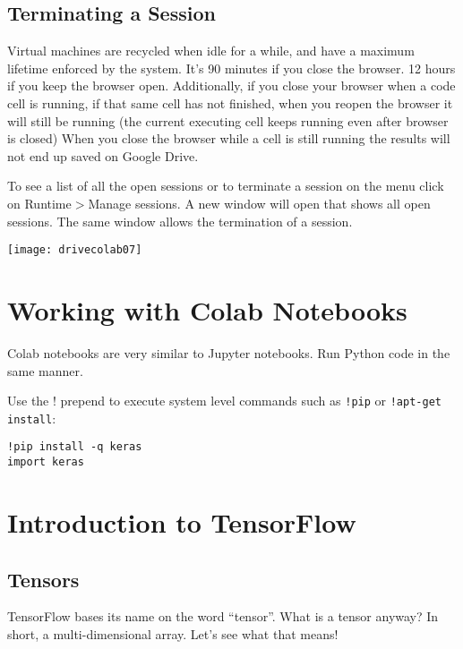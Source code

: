 \subsection{Terminating a Session}

Virtual machines are recycled when idle for a while, and have a maximum lifetime enforced by the system.
It's 90 minutes if you close the browser. 12 hours if you keep the browser open. Additionally, if you close your browser when a code cell is running, if that same cell has not finished, when you reopen the browser it will still be running (the current executing cell keeps running even after browser is closed)
When you close the browser while a cell is still running the results will not end up saved on Google Drive.


To see a list of all the open sessions or to terminate a session on the menu click on Runtime$>$Manage sessions.  A new window will open that shows all open sessions.  The same window allows the termination of a session.
\begin{marginfigure}
\texttt{[image: drivecolab07]}
\end{marginfigure}




\section{Working with Colab Notebooks}

Colab notebooks are very similar to Jupyter notebooks.
Run Python code in the same manner.

Use the ! prepend to execute system level commands such as \lstinline{!pip} or \lstinline{!apt-get install}:
\begin{lstlisting}
!pip install -q keras
import keras
\end{lstlisting}


\section{Introduction to TensorFlow}

\subsection{Tensors}

TensorFlow bases its name on the word ``tensor''. What is a tensor anyway? In short, a multi-dimensional array. Let's see what that means!

